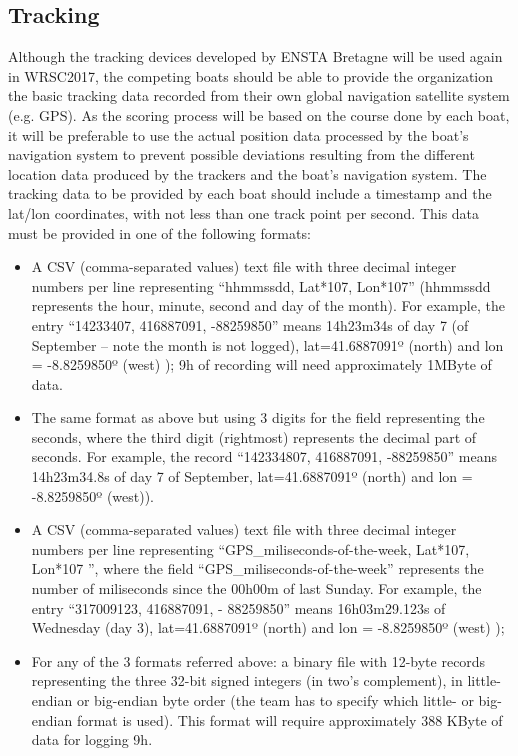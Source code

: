 \documentclass[12pt]{article}
\begin{document}
\subsection{Tracking}
Although the tracking devices developed by ENSTA Bretagne will be used again in
WRSC2017, the competing boats should be able to provide the organization the basic
tracking data recorded from their own global navigation satellite system (e.g. GPS). As the scoring
process will be based on the course done by each boat, it will be preferable to use the actual
position data processed by the boat’s navigation system to prevent possible deviations
resulting from the different location data produced by the trackers and the boat’s navigation
system.
The tracking data to be provided by each boat should include a timestamp and the
lat/lon coordinates, with not less than one track point per second. This data must be
provided in one of the following formats:
\begin{itemize}
  \item A CSV (comma-separated values) text file with three decimal integer numbers
per line representing “hhmmssdd, Lat*107, Lon*107” (hhmmssdd represents the hour,
minute, second and day of the month). For example, the entry “14233407,
416887091, -88259850” means 14h23m34s of day 7 (of September – note the month
is not logged), lat=41.6887091º (north) and lon = -8.8259850º (west) ); 9h of
recording will need approximately 1MByte of data.
  \item The same format as above but using 3 digits for the field representing the
seconds, where the third digit (rightmost) represents the decimal part of seconds. For
example, the record “142334807, 416887091, -88259850” means 14h23m34.8s of day 7
of September, lat=41.6887091º (north) and lon = -8.8259850º (west)).
 \item A CSV (comma-separated values) text file with three decimal integer numbers
per line representing “GPS\_miliseconds-of-the-week, Lat*107, Lon*107
”, where the field “GPS\_miliseconds-of-the-week” represents the number of miliseconds since
the 00h00m of last Sunday. For example, the entry “317009123, 416887091, -
88259850” means 16h03m29.123s of Wednesday (day 3), lat=41.6887091º (north) and
lon = -8.8259850º (west) );
 \item For any of the 3 formats referred above: a binary file with 12-byte records
representing the three 32-bit signed integers (in two’s complement), in little-endian or
big-endian byte order (the team has to specify which little- or big-endian format is used).
This format will require approximately 388 KByte of data for logging 9h.
\end{itemize}
\end{document}
